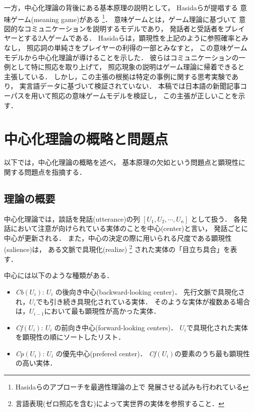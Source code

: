 一方，中心化理論の背後にある基本原理の説明として，
Hasidaら\citeyear{hasida1995,hasida1996}が提唱する
意味ゲーム(meaning game)がある
\footnote{Hasidaらのアプローチを最適性理論の上で
発展させる試みも行われている\cite{rooy2003,kibble2003}}．
意味ゲームとは，ゲーム理論に基づいて
意図的なコミュニケーションを説明するモデルであり，
発話者と受話者をプレイヤーとする2人ゲームである．
Hasidaらは，顕現性を上記のように参照確率とみなし，
照応詞の単純さをプレイヤーの利得の一部とみなすと，
この意味ゲームモデルから中心化理論が導けることを示した．
彼らはコミュニケーションの一例として特に照応を取り上げて，
照応現象の説明はゲーム理論に帰着できると主張している．
しかし，この主張の根拠は特定の事例に関する思考実験であり，
実言語データに基づいて検証されていない．
本稿では日本語の新聞記事コーパスを用いて照応の意味ゲームモデルを検証し，
この主張が正しいことを示す．








\section{中心化理論の概略と問題点}\label{sec:centering}
以下では，中心化理論の概略を述べ，
基本原理の欠如という問題点と顕現性に関する問題点を指摘する．

\subsection{理論の概要}
中心化理論では，談話を発話(utterance)の列
$[U_1, U_2, \cdots, U_n]$ として扱う．
各発話において注意が向けられている実体のことを中心(center)と言い，
発話ごとに中心が更新される．
また，中心の決定の際に用いられる尺度である顕現性(salience)は，
ある文脈で具現化(realize)
\footnote{言語表現(ゼロ照応を含む)によって実世界の実体を参照すること．}
された実体の「目立ち具合」を表す．

中心には以下のような種類がある．
\begin{itemize}
\item {\it Cb}$(U_i)$: $U_i$ の後向き中心(backward-looking center)．
先行文脈で具現化され，$U_i$でも引き続き具現化されている実体．
そのような実体が複数ある場合は，$U_{i-1}$において最も顕現性が高かった実体．
\item {\it Cf}$(U_i)$: $U_i$ の前向き中心(forward-looking centers)．
$U_i$で具現化された実体を顕現性の順にソートしたリスト．
\item {\it Cp}$(U_i)$: $U_i$ の優先中心(prefered center)．
{\it Cf}$(U_i)$の要素のうち最も顕現性の高い実体．
\end{itemize}


